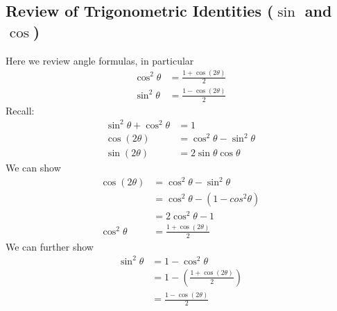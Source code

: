\documentclass{report}
\begin{document}
\subsection{Review of Trigonometric Identities ($\sin$ and $\cos$)} %
Here we review angle formulas, in particular
\begin{align*}
\cos^2\theta&=\frac{1+\cos(2\theta)}{2}\\
\sin^2\theta&=\frac{1-\cos(2\theta)}{2}
\end{align*}
Recall:
\begin{align*}
\sin^2\theta+\cos^2\theta&=1\\
\cos(2\theta)&=\cos^2\theta-\sin^2\theta\\
\sin(2\theta)&=2\sin\theta\cos\theta
\end{align*}
We can show
\begin{align*}
\cos(2\theta)&=\cos^2\theta-\sin^2\theta\\
&=\cos^2\theta-(1-cos^2\theta)\\
&=2\cos^2\theta-1\\
\cos^2\theta&=\frac{1+\cos(2\theta)}{2}
\end{align*}
We can further show
\begin{align*}
\sin^2\theta&=1-\cos^2\theta\\
&=1-\left(\frac{1+\cos(2\theta)}{2}\right)\\
&=\frac{1-\cos(2\theta)}{2}
\end{align*}
\newpage
\end{document}
